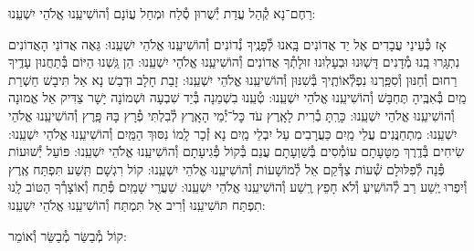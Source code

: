 \documentclass[twoside, openany, parskip=half, 11pt]{book}
\begin{document}
\shatzvkahal
רַחֶם־נָא קְ֯הַל עֲדַת יְ֯שֻׁרוּן סְ֯לַח וּמְחַל עֲוֹנָם וְ֯הוֹשִׁיעֵֽנוּ אֱלֹהֵי יִשְׁעֵֽנוּ:

\begin{small}
אָז כְּ֯עֵינֵי עֲבָדִים אֶל יַד אֲדוֹנִים בָּֽאנוּ לְ֯פָנֶֽיךָ נְ֯דוֹנִים וְ֯הוֹשִׁיעֵֽנוּ אֱלֹהֵי יִשְׁעֵֽנוּ:
גֵּאֶה אֲדוֹנֵי הָאֲדוֹנִים נִתְגָּֽרוּ בָֽנוּ מְ֯דָנִים דָּשֽׁוּנוּ וּבְעָלֽוּנוּ זוּלָתְ֯ךָ אֲדוֹנִים וְ֯הוֹשִׁיעֵֽנוּ אֱלֹהֵי יִשְׁעֵֽנוּ:
הֵן גַּֽשְׁנוּ הַיּוֹם בְּ֯תַחֲנוּן עָדֶֽיךָ רַחוּם וְ֯חַנּוּן וְ֯סִפַּֽרְנוּ נִפְלְ֯אוֹתֶֽיךָ בְּ֯שִׁנּוּן וְ֯הוֹשִׁיעֵֽנוּ אֱלֹהֵי יִשְׁעֵֽנוּ:
זָבַת חָלָב וּדְבַשׁ נָא אַל תִּיבָשׁ חַשְׁרַת מַֽיִם בְּ֯אִבֶּֽיהָ תֶּחְבָּשׁ וְ֯הוֹשִׁיעֵֽנוּ אֱלֹהֵי יִשְׁעֵֽנוּ:
טְ֯עֵֽנוּ בִשְׁמֵנָה בְּ֯יַד שִׁבְעָה וּשְׁמוֹנָה יָשָׁר צַדִּיק אֵל אֱמוּנָה וְ֯הוֹשִׁיעֵֽנוּ אֱלֹהֵי יִשְׁעֵֽנוּ:
כָּרַֽתָּ בְ֯רִית לָאָֽרֶץ עֹד כׇּל־יְ֯מֵי הָאָֽרֶץ לְ֯בִלְתִּי פְ֯רָץ בָּהּ פָּֽרֶץ וְ֯הוֹשִׁיעֵֽנוּ אֱלֹהֵי יִשְׁעֵֽנוּ:
מִתְחַנֲּנִים עֲלֵי מַֽיִם כַּעֲרָבִים עַל יִבְלֵי מַֽיִם נָא זְ֯כָר לָֽמוֹ נִסּוּךְ הַמַּֽיִם וְ֯הוֹשִׁיעֵֽנוּ אֱלֹהֵי יִשְׁעֵֽנוּ:
שִׂיחִים בְּ֯דֶֽרֶךְ מַטָּעָתָם עוֹמְ֯סִים בְּ֯שַׁוְעָתָם עֲנֵם בְּ֯קוֹל פְּ֯גִיעָתָם וְ֯הוֹשִׁיעֵֽנוּ אֱלֹהֵי יִשְׁעֵֽנוּ:
פּוֹעֵל יְ֯שׁוּעוֹת פְּ֯נֵה לְ֯פִלּוּלָם שְׁ֯עוֹת צַדְּ֯קֵם אֵל לְ֯מוֹשָׁעוֹת וְ֯הוֹשִׁיעֵֽנוּ אֱלֹהֵי יִשְׁעֵֽנוּ:
קוֹל רִגְשָׁם תִּֽשַׁע תִּפְתַּח אֶֽרֶץ וְ֯יִפְרוּ יֶֽשַׁע רַב לְ֯הוֹשִֽׁיעַ וְ֯לֹא חָפֵץ רֶֽשַׁע וְ֯הוֹשִׁיעֵֽנוּ אֱלֹהֵי יִשְׁעֵֽנוּ:
שַׁעֲרֵי שָׁמַֽיִם פְּ֯תַח וְ֯אוֹצָרְ֯ךָ הַטּוֹב לָֽנוּ תִפְתַּח תּוֹשִׁיעֵֽנוּ וְ֯רִיב אַל תִּמְתַּח וְ֯הוֹשִׁיעֵֽנוּ אֱלֹהֵי יִשְׁעֵֽנוּ:

\end{small}

\begin{large}
קוֹל מְ֯בַשֵּׂר מְ֯בַשֵּׂר וְ֯אוֹמֵר:

\end{large}
\end{document}
